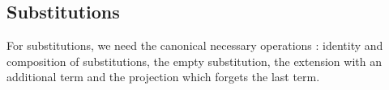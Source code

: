 \begin{AgdaAlign}
\subsection{Substitutions}
For substitutions, we need the canonical necessary operations \cite{AltenkirchK16,Chapman09}: identity and composition of
substitutions, the empty substitution, the extension with an additional term and the projection which forgets the last term.
\begin{code}%
%
\>[2]\AgdaSpace{}%
\AgdaSpace{}%
\AgdaSymbol{:}\AgdaSpace{}%
\AgdaSpace{}%
\AgdaSymbol{\{}\AgdaSymbol{\}}\AgdaSpace{}%
\AgdaSpace{}%
\AgdaSpace{}%
\AgdaSpace{}%
\AgdaSpace{}%
\AgdaSpace{}%
\AgdaSpace{}%
\AgdaSpace{}%
\AgdaSpace{}%
\<%
\\
\>[2][@{}l@{\AgdaIndent{0}}]%
\>[4]\AgdaSpace{}%
\AgdaSymbol{:}\AgdaSpace{}%
\AgdaSpace{}%
\AgdaSymbol{\{}\AgdaSymbol{\}}\AgdaSpace{}%
\AgdaSymbol{(}\AgdaSpace{}%
\AgdaSymbol{:}\AgdaSpace{}%
\AgdaSpace{}%
\AgdaSymbol{)}\AgdaSpace{}%
\AgdaSpace{}%
\AgdaSpace{}%
\AgdaSpace{}%
\<%
\\
%
\>[4]\AgdaSpace{}%
\AgdaSymbol{:}\AgdaSpace{}%
\AgdaSpace{}%
\AgdaSymbol{\{}\AgdaSymbol{\}}\AgdaSpace{}%
\AgdaSymbol{(}\AgdaSpace{}%
\AgdaSymbol{:}\AgdaSpace{}%
\AgdaSpace{}%
\AgdaSymbol{)}\AgdaSpace{}%
\AgdaSpace{}%
\AgdaSpace{}%
\AgdaSpace{}%
\<%
\\
%
\>[4]\AgdaOperator{\AgdaInductiveConstructor{\AgdaUnderscore{},\AgdaUnderscore{}}}\AgdaSpace{}%
\AgdaSymbol{:}\AgdaSpace{}%
\AgdaSpace{}%
\AgdaSymbol{\{}\AgdaSymbol{\}}\AgdaSpace{}%
\AgdaSymbol{\{}\AgdaSpace{}%
\AgdaSpace{}%
\AgdaSymbol{:}\AgdaSpace{}%
\AgdaSpace{}%
\AgdaSymbol{\}}\AgdaSpace{}%
\AgdaSymbol{\{}\AgdaSpace{}%
\AgdaSymbol{:}\AgdaSpace{}%
\AgdaSpace{}%
\AgdaSymbol{\}}\AgdaSpace{}%
\AgdaSpace{}%
\AgdaSpace{}%
\AgdaSpace{}%
\AgdaSpace{}%
\AgdaSpace{}%
\AgdaSpace{}%

\end{code}
\end{AgdaAlign}
